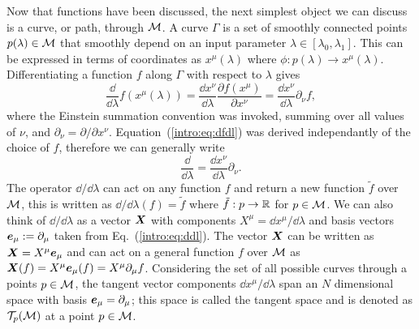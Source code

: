 Now that functions have been discussed, the next simplest object we can discuss is a curve, or path, through $\mathcal{M}$. A curve $\Gamma$ is a set of smoothly connected points $p(\lambda)\in \mathcal{M}$ that smoothly depend on an input parameter $\lambda \in [\lambda_0,\lambda_1]$. This can be expressed in terms of coordinates as $x^\mu(\lambda)$ where $\phi:p(\lambda) \rightarrow x^\mu(\lambda)$. Differentiating a function $f$ along $\Gamma$ with respect to $\lambda$ gives
\begin{equation} \label{intro:eq:dfdl}
\frac{\dd}{\dd \lambda}f(x^\mu(\lambda)) = \frac{\dd x^\nu}{\dd \lambda}\frac{\partial f(x^\mu)}{\partial x^\nu} = \frac{\dd x^\nu}{\dd \lambda}\partial_\nu f,
\end{equation}
where the Einstein summation convention was invoked, summing over all values of $\nu$, and $\partial_\nu = {\partial}/{\partial x^\nu}$. Equation~(\ref{intro:eq:dfdl}) was derived independantly of the choice of $f$, therefore we can generally write
\begin{equation} \label{intro:eq:ddl}
\frac{\dd}{\dd \lambda} = \frac{\dd x^\nu}{\dd \lambda}\partial_\nu.
\end{equation}
The operator $\dd/\dd \lambda $ can act on any function $f$ and return a new function $\tilde{f}$ over $\mathcal{M}$, this is written as $\dd/\dd \lambda (f) = \tilde{f}$ where $\tilde{f}:p\rightarrow \mathbb{R}$ for $p\in\mathcal{M}$. We can also think of $\dd/\dd \lambda$ as a vector $\boldsymbol{X}$ with components $X^\mu=\dd x^\mu / \dd \lambda$ and basis vectors $\boldsymbol{e}_\mu:=\partial_\mu$ taken from Eq.~(\ref{intro:eq:ddl}). The vector $\boldsymbol{X}$ can be written as $\boldsymbol{X} = X^\mu \boldsymbol{e}_\mu$ and can act on a general function $f$ over $\mathcal{M}$ as $\boldsymbol{X}(f) = X^\mu \boldsymbol{e}_\mu(f) = X^\mu \partial_\mu f$. Considering the set of all possible curves through a points $p\in\mathcal{M}$, the tangent vector components $\dd x^\mu / \dd \lambda$ span an $N$ dimensional space with basis $\boldsymbol{e}_\mu = \partial_\mu$; this space is called the tangent space and is denoted as $\mathcal{T}_p(\mathcal{M})$ at a point $p\in\mathcal{M}$. 

